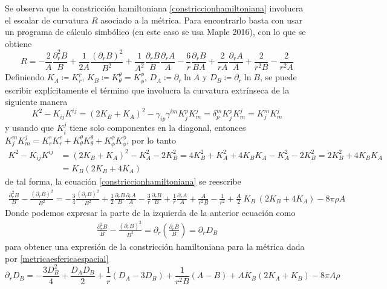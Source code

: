 \documentclass[11pt,twoside,openright,spanish]{report}
\numberwithin{equation}{chapter}
\numberwithin{figure}{chapter}
\numberwithin{table}{chapter}
\begin{document}
Se observa que la constricción hamiltoniana \eqref{constriccionhamiltoniana} involucra el escalar de curvatura $R$ asociado a la métrica. Para encontrarlo basta con usar un programa de cálculo simbólico (en este caso se usa Maple 2016), con lo que se obtiene 
\begin{equation*}
R = -\frac{2}{A}\frac{\partial_r^2B}{B}+\frac{1}{2A}\frac{(\partial_r B)^2}{B^2}+\frac{1}{A^2}\frac{\partial_rB}{B}\frac{\partial_r A}{A}-\frac{6}{r}\frac{\partial_r B}{BA}+\frac{2}{rA}\frac{\partial_rA}{A}+\frac{2}{r^2B}-\frac{2}{r^2A}
\end{equation*}
Definiendo $K_A\coloneqq K_r^r$, $K_B\coloneqq K_{\theta}^{\theta}=K_{\phi}^\phi$, $D_A\coloneqq\partial_r\ln A$ y  $D_B\coloneqq\partial_r \ln B$, se puede escribir explícitamente el término que involucra la curvatura extrínseca de la siguiente manera
\begin{equation*}
K^2-K_{ij}K^{ij}=(2K_B+K_A)^2-\gamma_{ip}\gamma^{im}K_j^pK^j_m=\delta^m_p K_j^pK_m^j=K_j^mK^j_m
\end{equation*}
y usando que $K_i^j$ tiene solo componentes en la diagonal, entonces $K_j^mK^j_m=K_r^rK_r^r+K_\theta^\theta K_\theta^\theta+K_\phi^\phi K_\phi^\phi$, por lo tanto
\begin{align*}
K^2-K_{ij}K^{ij}&=(2K_B+K_A)^2-K_A^2-2K_B^2=4K_B^2+K_A^2+4K_BK_A-K_A^2-2K_B^2=2K_B^2+4K_BK_A\\
&=K_B(2K_B+4K_A)
\end{align*}
de tal forma, la ecuación \eqref{constriccionhamiltoniana} se reescribe
\begin{align*}
\frac{\partial_r^2B}{B}-\frac{\left(\partial_rB\right)^2}{B^2}=-\frac{3}{4}\frac{\left(\partial_rB\right)^2}{B^2}+\frac{1}{2}\frac{\partial_rB}{B}\frac{\partial_rA}{A}-\frac{3}{r}\frac{\partial_rB}{B}+\frac{1}{r}\frac{\partial_rA}{A}+\frac{A}{r^2B}-\frac{1}{r^2}+\frac{A}{2}\ K_B\ (2K_B+4K_A)-8\pi\rho A
\end{align*}
Donde podemos expresar la parte de la izquierda de la anterior ecuación como
\begin{align*}
\frac{\partial_r^2B}{B}-\frac{\left(\partial_rB\right)^2}{B^2}=\partial_r\left( \frac{\partial_rB}{B}\right)=\partial_r D_B
\end{align*}
para obtener una expresión de la constricción hamiltoniana para la métrica dada por \eqref{metricaesfericaespacial}
\begin{equation}
\partial_r D_B=-\frac{3D_B^2}{4}+\frac{D_A D_B}{2}+\frac{1}{r}\left(D_A-3D_B\right)+\frac{1}{r^2B}\left(A-B\right)+AK_B\left(2K_A+K_B\right)-8\pi A\rho
\end{equation}
\end{document}
